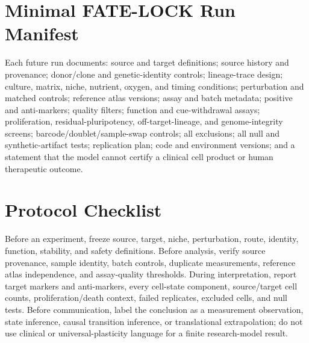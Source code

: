 \documentclass[10pt,conference]{IEEEtran}
\begin{document}
\appendices
\section{Minimal FATE-LOCK Run Manifest}
\label{app:manifest}

Each future run documents: source and target definitions; source history and provenance; donor/clone and genetic-identity controls; lineage-trace design; culture, matrix, niche, nutrient, oxygen, and timing conditions; perturbation and matched controls; reference atlas versions; assay and batch metadata; positive and anti-markers; quality filters; function and cue-withdrawal assays; proliferation, residual-pluripotency, off-target-lineage, and genome-integrity screens; barcode/doublet/sample-swap controls; all exclusions; all null and synthetic-artifact tests; replication plan; code and environment versions; and a statement that the model cannot certify a clinical cell product or human therapeutic outcome.

\section{Protocol Checklist}
\label{app:checklist}

Before an experiment, freeze source, target, niche, perturbation, route, identity, function, stability, and safety definitions. Before analysis, verify source provenance, sample identity, batch controls, duplicate measurements, reference atlas independence, and assay-quality thresholds. During interpretation, report target markers and anti-markers, every cell-state component, source/target cell counts, proliferation/death context, failed replicates, excluded cells, and null tests. Before communication, label the conclusion as a measurement observation, state inference, causal transition inference, or translational extrapolation; do not use clinical or universal-plasticity language for a finite research-model result.
\end{document}

